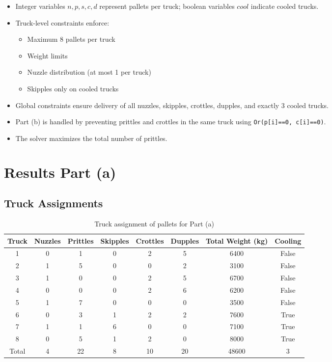 \documentclass{article}
\begin{document}
\begin{itemize}
    \item Integer variables $n,p,s,c,d$ represent pallets per truck; boolean variables $cool$ indicate cooled trucks.
    \item Truck-level constraints enforce:
        \begin{itemize}
            \item Maximum 8 pallets per truck
            \item Weight limits
            \item Nuzzle distribution (at most 1 per truck)
            \item Skipples only on cooled trucks
        \end{itemize}
    \item Global constraints ensure delivery of all nuzzles, skipples, crottles, dupples, and exactly 3 cooled trucks.
    \item Part (b) is handled by preventing prittles and crottles in the same truck using \texttt{Or(p[i]==0, c[i]==0)}.
    \item The solver maximizes the total number of prittles.
\end{itemize}


\section{Results Part (a)}

\subsection{Truck Assignments}

\begin{table}[H]
\centering
\caption{Truck assignment of pallets for Part (a)}
\small
\begin{tabular}{c|ccccc|c|c}
\toprule
Truck & Nuzzles & Prittles & Skipples & Crottles & Dupples & Total Weight (kg) & Cooling \\
\midrule
1 & 0 & 1 & 0 & 2 & 5 & 6400 & False \\
2 & 1 & 5 & 0 & 0 & 2 & 3100 & False \\
3 & 1 & 0 & 0 & 2 & 5 & 6700 & False \\
4 & 0 & 0 & 0 & 2 & 6 & 6200 & False \\
5 & 1 & 7 & 0 & 0 & 0 & 3500 & False \\
6 & 0 & 3 & 1 & 2 & 2 & 7600 & True \\
7 & 1 & 1 & 6 & 0 & 0 & 7100 & True \\
8 & 0 & 5 & 1 & 2 & 0 & 8000 & True \\
\midrule
Total & 4 & 22 & 8 & 10 & 20 & 48600 & 3 \\
\bottomrule
\end{tabular}
\end{table}
\end{document}
